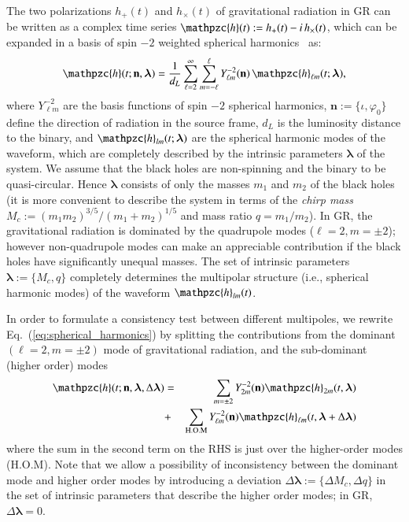 \documentclass[prl,preprintnumbers,twocolumn,eqsecnum,floatfix,a4paper,nofootinbib,superscriptaddress]{revtex4}
\newcommand{\h}{\mathpzc{h}}
\newcommand{\hlm}{\mathpzc{h}_{\ell m}}
\newcommand{\Ylm}{{Y}^{-2}_{\ell m}}
\newcommand{\blambda}{\bm{\lambda}}
\newcommand{\n}{\mathbf{n}}
\begin{document}
The two polarizations $h_+(t)$ and $h_\times(t)$ of gravitational radiation in GR can be written as a complex time series $\h(t) := h_+(t) - i \, h_\times(t)$, which can be expanded in a basis of spin $-2$ weighted spherical harmonics~\cite{NewmanPenrose} as:
\begin{equation}
\h(t; \n, \blambda) =  \frac{1}{d_L} \sum _{\ell=2}^{\infty} \sum _{m=-\ell}^{\ell} \Ylm (\n) \, {{\hlm}(t; \blambda)}, 
\label{eq:spherical_harmonics}
\end{equation}
where $\Ylm$ are the basis functions of spin $-2$ spherical harmonics, $\n := \{\iota, \varphi_0\}$ define the direction of radiation in the source frame, $d_L$ is  the luminosity distance to the binary, and ${\h}_{lm}(t; \blambda)$ are the spherical harmonic modes of the waveform, which are completely described by the intrinsic parameters $\blambda$ of the system. We assume that the black holes are non-spinning and the binary to be quasi-circular. Hence $\blambda$ consists of only the masses $m_1$ and $m_2$ of the black holes (it is more convenient to describe the system in terms of the \emph{chirp mass} $M_c := {(m_1m_2)^{3/5}}/{(m_1+m_2)^{1/5}}$ and mass ratio $q = m_1/m_2$). In GR, the gravitational radiation is dominated by the quadrupole modes ($\ell = 2, m = \pm 2$); however non-quadrupole modes can make an appreciable contribution if the black holes have significantly unequal masses. The set of intrinsic parameters $\blambda := \{M_c, q\}$ completely determines the multipolar structure (i.e., spherical harmonic modes) of the waveform ${\h}_{lm}(t)$. 

In order to formulate a consistency test between different multipoles, we rewrite Eq.~(\ref{eq:spherical_harmonics}) by splitting the contributions from the dominant $(\ell = 2, m = \pm 2)$ mode of gravitational radiation, and the sub-dominant (higher order) modes 
\begin{eqnarray}
\h(t; \n, \blambda, \Delta \blambda) & = & \sum_{m = \pm2} Y^{-2}_{2m} (\n) {\h}_{2m}(t, \blambda)  \nonumber \\ 
& + & \sum _{\text{H.O.M}} \Ylm (\n) \hlm(t, \blambda+\Delta \blambda)
\label{eq:test_HM}
\end{eqnarray}
where the sum in the second term on the RHS is just over the higher-order modes (H.O.M). Note that we allow a possibility of inconsistency between the dominant mode and higher order modes by introducing a deviation $\Delta \blambda := \{\Delta M_c, \Delta q\}$ in the set of intrinsic parameters that describe the higher order modes; in GR,  $\Delta \blambda = 0$. 
\end{document}
